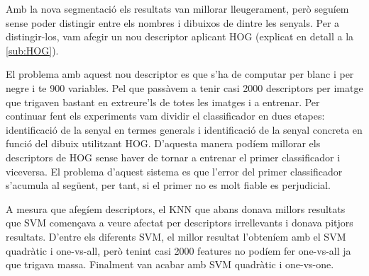 Amb la nova segmentació els resultats van millorar lleugerament, però seguíem sense poder distingir entre els nombres
i dibuixos de dintre les senyals. Per a distingir-los, vam afegir un nou descriptor aplicant HOG
(explicat en detall a la \cref{sub:HOG}).

El problema amb aquest nou descriptor es que s'ha de computar per blanc i per negre i te 900 variables. Pel que passàvem
a tenir casi 2000 descriptors per imatge que trigaven bastant en extreure'ls de totes les imatges i a entrenar. Per
continuar fent els experiments vam dividir el classificador en dues etapes: identificació de la senyal en termes generals
i identificació de la senyal concreta en funció del dibuix utilitzant HOG. D'aquesta manera podíem millorar els descriptors
de HOG sense haver de tornar a entrenar el primer classificador i viceversa. El problema d'aquest sistema es que l'error
del primer classificador s'acumula al següent, per tant, si el primer no es molt fiable es perjudicial.

A mesura que afegíem descriptors, el KNN que abans donava millors resultats que SVM començava a veure afectat per
descriptors irrellevants i donava pitjors resultats. D'entre els diferents SVM, el millor resultat l'obteníem amb
el SVM quadràtic i one-vs-all, però tenint casi 2000 features no podíem fer one-vs-all ja que trigava massa.
Finalment van acabar amb SVM quadràtic i one-vs-one.

